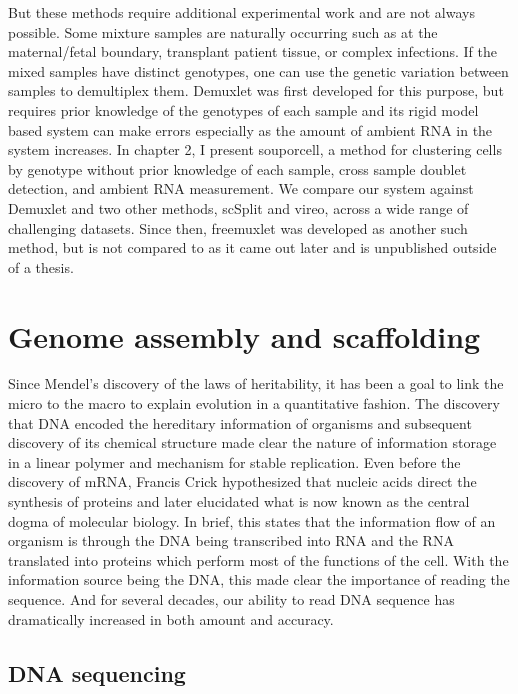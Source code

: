 \par{
But these methods require additional experimental work and are not always possible. Some mixture samples are naturally occurring such as at the maternal/fetal boundary, transplant patient tissue, or complex infections. If the mixed samples have distinct genotypes, one can use the genetic variation between samples to demultiplex them. Demuxlet was first developed for this purpose, but requires prior knowledge of the genotypes of each sample and its rigid model based system can make errors especially as the amount of ambient RNA in the system increases\cite{muxseq}\cite{demuxlet}. In chapter 2, I present souporcell, a method for clustering cells by genotype without prior knowledge of each sample, cross sample doublet detection, and ambient RNA measurement. We compare our system against Demuxlet and two other methods, scSplit and vireo\cite{scsplit}\cite{vireo}, across a wide range of challenging datasets. Since then, freemuxlet was developed as another such method, but is not compared to as it came out later and is unpublished outside of a thesis\cite{freemuxlet}.
}

\section{Genome assembly and scaffolding}
\par{
Since Mendel's discovery of the laws of heritability\cite{mendel}, it has been a goal to link the micro to the macro to explain evolution in a quantitative fashion\cite{evolutionmicro}. The discovery that DNA encoded the hereditary information of organisms\cite{Avery} and subsequent discovery of its chemical structure\cite{watsoncrick} made clear the nature of information storage in a linear polymer and mechanism for stable replication. Even before the discovery of mRNA\cite{mRNA1}\cite{mRNA2}, Francis Crick hypothesized that nucleic acids direct the synthesis of proteins\cite{proteinsynthesis} and later elucidated what is now known as the central dogma of molecular biology\cite{centraldogma1}. In brief, this states that the information flow of an organism is through the DNA being transcribed into RNA and the RNA translated into proteins which perform most of the functions of the cell. With the information source being the DNA, this made clear the importance of reading the sequence. And for several decades, our ability to read DNA sequence has dramatically increased in both amount and accuracy.
}

\subsection{DNA sequencing}

